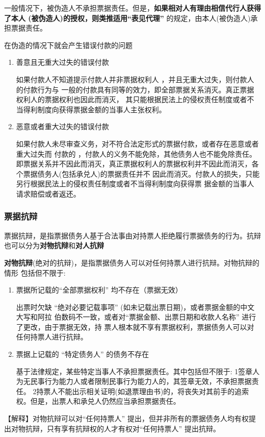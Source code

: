 \documentclass[UTF8,12pt]{ctexart}
\numberwithin{equation}{section} %
\numberwithin{figure}{section}
\numberwithin{table}{section}
\begin{document}
	一般情况下，被伪造人不承担票据责任。但是，\textbf{如果相对人有理由相信代行人获得了本人 (被伪造人)的授权，则类推适用“表见代理”} 的规定，由本人(被伪造人)承担票据责任。
	
	在伪造的情况下就会产生错误付款的问题
	\begin{enumerate}
		\item 善意且无重大过失的错误付款
		
		如果付款人不知道提示付款人并非票据权利人 ，并且无重大过失，则付款人的付款行为与 一般的付款具有同等的效力，即全部票据关系消灭。真正票据权利人的票据权利也因此而消灭， 其只能根据民法上的侵权责任制度或者不当得利制度向获得票据金额的当事人主张权利。
		
		\item 恶意或者重大过失的错误付款 
		
		如果付款人未尽审查义务，对不符合法定形式的票据付款，或者存在恶意或者重大过失而 付款的 ，付款人的义务不能免除，其他债务人也不能免除责任。即票据关系并不因此而消灭，真正票据权利人的票据权利并不因此而消灭，各个票据债务人(包括承兑人)的票据责任并不 因此而消灭。付款人的损失，只能另行根据民法上的侵权责任制度或者不当得利制度向获得票 据金额的当事人请求赔偿或者返还。
	\end{enumerate}

	
	\subsubsection{票据抗辩}
	票据抗辩，是指票据债务人基于合法事由对持票人拒绝履行票据债务的行为。抗辩也可以分为\textbf{对物抗辩}和\textbf{对人抗辩}
	
	\textbf{对物抗辩}(绝对的抗辩)，是指票据债务人可以对任何持票人进行抗辩。对物抗辩的情形 包括但不限于:
	\begin{enumerate}
		\item 票据所记载的“全部票据权利” 均不存在（票据无效）
		
		出票时欠缺 “绝对必要记载事项” (如未记载出票日期)，或者票据金额的中文大写和阿拉 伯数码不一致，或者对“票据金额、出票日期和收款人名称” 进行了更改，由于票据无效，持 票人根本就不享有票据权利，票据债务人可以对任何持票人进行抗辩。
		
		\item 票据上记载的 “特定债务人” 的债务不存在
		
		基于法律规定，某些特定当事人不承担票据责任。其中包括但不限于: 1签章人为无民事行为能力人或者限制民事行为能力人的，其签章无效，不承担票据责任。 2持票人不能出示相关证明(如退票理由书)的，将丧失对其前手的追索权。但是，出票人和承兑人仍然应当承担票据责任。
	\end{enumerate}
	【解释】对物抗辩可以对“任何持票人” 提出，但并非所有的票据债务人均有权提出对物抗辩，只有享有抗辩权的人才有权对“任何持票人” 提出抗辩。
	
\end{document}
